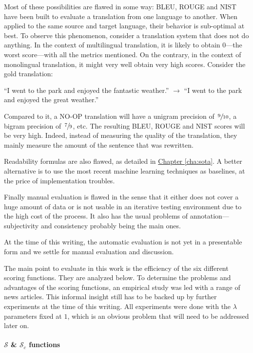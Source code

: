 \documentclass[a4paper, 11pt, onepage]{scrreprt}
\newcommand\chapterref[1]{\hyperref[#1]{Chapter \ref*{#1}}}
\begin{document}
Most of these possibilities are flawed in some way: BLEU, ROUGE and
NIST have been built to evaluate a translation from one language to
another. When applied to the same source and target language, their
behavior is sub-optimal at best. To observe this phenomenon, consider
a translation system that does not do anything. In the context of
multilingual translation, it is likely to obtain $0$—the worst
score—with all the metrics mentioned. On the contrary, in the context
of monolingual translation, it might very well obtain very high
scores. Consider the gold translation:

“I went to the park and enjoyed the fantastic weather.” $\rightarrow$
“I went to the park and enjoyed the great weather.”

Compared to it, a NO-OP translation will have a unigram precision of
$\,\sfrac{9}{10}$, a bigram precision of $\,\sfrac{7}{9}$, etc. The
resulting BLEU, ROUGE and NIST scores will be very high. Indeed,
instead of measuring the quality of the translation, they mainly
measure the amount of the sentence that was rewritten.

Readability formulas are also flawed, as detailed
in \chapterref{cha:sota}. A better alternative is to use the most
recent machine learning techniques as baselines, at the price of
implementation troubles.

Finally manual evaluation is flawed in the sense that it either does
not cover a huge amount of data or is not usable in an iterative
testing environment due to the high cost of the process. It also has
the usual problems of annotation—subjectivity and consistency probably
being the main ones.

At the time of this writing, the automatic evaluation is not yet in a
presentable form and we settle for manual evaluation and discussion.

The main point to evaluate in this work is the efficiency of the six
different scoring functions. They are analyzed below. To determine the
problems and advantages of the scoring functions, an empirical study
was led with a range of news articles. This informal insight still has
to be backed up by further experiments at the time of this
writing. All experiments were done with the $\lambda$ parameters fixed
at $1$, which is an obvious problem that will need to be addressed
later on.

\paragraph*{$\mathcal{S}$ \& $\mathcal{S}_c$ functions}
\label{par:occ}
\end{document}
